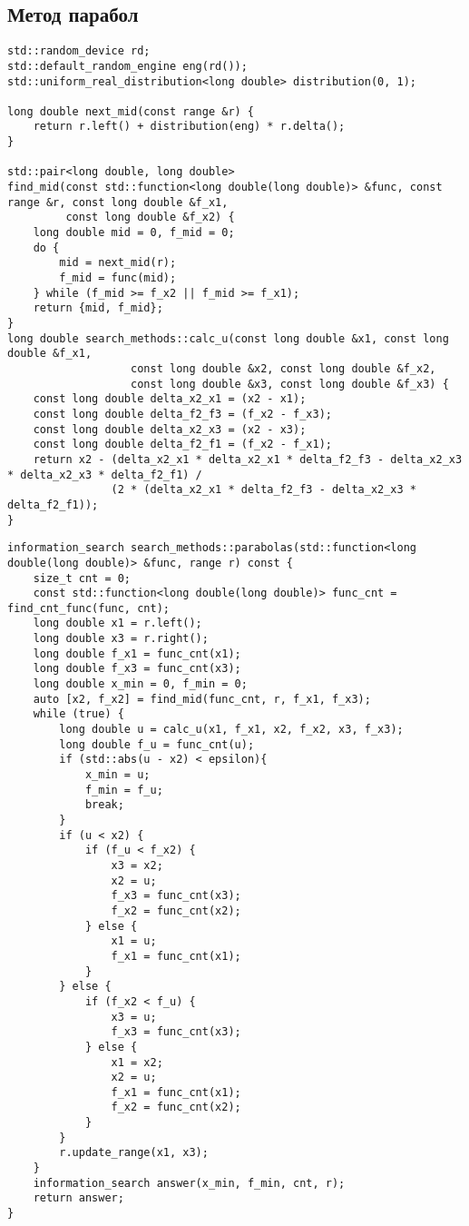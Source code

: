 \newpage
\subsection{Метод парабол} 
\begin{lstlisting}
std::random_device rd;
std::default_random_engine eng(rd());
std::uniform_real_distribution<long double> distribution(0, 1);

long double next_mid(const range &r) {
    return r.left() + distribution(eng) * r.delta();
}

std::pair<long double, long double>
find_mid(const std::function<long double(long double)> &func, const range &r, const long double &f_x1,
         const long double &f_x2) {
    long double mid = 0, f_mid = 0;
    do {
        mid = next_mid(r);
        f_mid = func(mid);
    } while (f_mid >= f_x2 || f_mid >= f_x1);
    return {mid, f_mid};
}
long double search_methods::calc_u(const long double &x1, const long double &f_x1,
                   const long double &x2, const long double &f_x2,
                   const long double &x3, const long double &f_x3) {
    const long double delta_x2_x1 = (x2 - x1);
    const long double delta_f2_f3 = (f_x2 - f_x3);
    const long double delta_x2_x3 = (x2 - x3);
    const long double delta_f2_f1 = (f_x2 - f_x1);
    return x2 - (delta_x2_x1 * delta_x2_x1 * delta_f2_f3 - delta_x2_x3 * delta_x2_x3 * delta_f2_f1) /
                (2 * (delta_x2_x1 * delta_f2_f3 - delta_x2_x3 * delta_f2_f1));
}
\end{lstlisting}
\newpage
\begin{lstlisting}
information_search search_methods::parabolas(std::function<long double(long double)> &func, range r) const {
    size_t cnt = 0;
    const std::function<long double(long double)> func_cnt = find_cnt_func(func, cnt);
    long double x1 = r.left();
    long double x3 = r.right();
    long double f_x1 = func_cnt(x1);
    long double f_x3 = func_cnt(x3);
    long double x_min = 0, f_min = 0;
    auto [x2, f_x2] = find_mid(func_cnt, r, f_x1, f_x3);
    while (true) {
        long double u = calc_u(x1, f_x1, x2, f_x2, x3, f_x3);
        long double f_u = func_cnt(u);
        if (std::abs(u - x2) < epsilon){
            x_min = u;
            f_min = f_u;
            break;
        }
        if (u < x2) {
            if (f_u < f_x2) {
                x3 = x2;
                x2 = u;
                f_x3 = func_cnt(x3);
                f_x2 = func_cnt(x2);
            } else {
                x1 = u;
                f_x1 = func_cnt(x1);
            }
        } else {
            if (f_x2 < f_u) {
                x3 = u;
                f_x3 = func_cnt(x3);
            } else {
                x1 = x2;
                x2 = u;
                f_x1 = func_cnt(x1);
                f_x2 = func_cnt(x2);
            }
        }
        r.update_range(x1, x3);
    }
    information_search answer(x_min, f_min, cnt, r);
    return answer;
}
\end{lstlisting}

